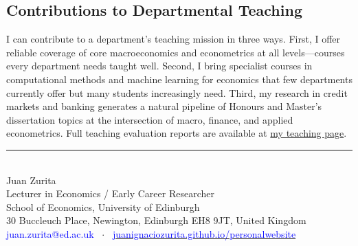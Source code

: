 \documentclass[12pt,a4paper]{article}
\begin{document}
\subsection*{Contributions to Departmental Teaching}
\vspace{-0.3cm}

I can contribute to a department's teaching mission in three ways. First, I offer reliable coverage of core macroeconomics and econometrics at all levels---courses every department needs taught well. Second, I bring specialist courses in computational methods and machine learning for economics that few departments currently offer but many students increasingly need. Third, my research in credit markets and banking generates a natural pipeline of Honours and Master's dissertation topics at the intersection of macro, finance, and applied econometrics. Full teaching evaluation reports are available at \href{https://juanignaciozurita.github.io/personalwebsite/files/teaching_evaluations.pdf}{my teaching page}.

\vspace{0.5em}
\rule{5cm}{1pt} \\
Juan Zurita\\
Lecturer in Economics / Early Career Researcher\\
School of Economics, University of Edinburgh\\
30 Buccleuch Place, Newington, Edinburgh EH8 9JT, United Kingdom\\
\textcolor{blue}{juan.zurita@ed.ac.uk} \ $\cdot$ \ \href{https://juanignaciozurita.github.io/personalwebsite/}{\textcolor{blue}{juanignaciozurita.github.io/personalwebsite}}
\end{document}
